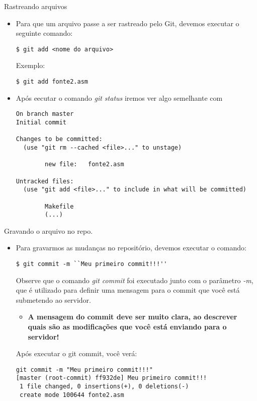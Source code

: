 \begin{slide}[method=direct]{Rastreando arquivos}
	\begin{itemize}
	\item{Para que um arquivo passe a ser rastreado pelo Git, devemos executar o seguinte comando:
		\begin{lstlisting}[style=Bash]
$ git add <nome do arquivo>
		\end{lstlisting}
	       	
	        Exemplo:
	        \begin{lstlisting}[style=Bash]
$ git add fonte2.asm
	        \end{lstlisting}
	        }
	\item{Após eecutar o comando \textit{git status} iremos ver algo semelhante com}
	\begin{lstlisting}[basicstyle=\tiny]
On branch master
Initial commit

Changes to be committed:
  (use "git rm --cached <file>..." to unstage)

        new file:   fonte2.asm

Untracked files:
  (use "git add <file>..." to include in what will be committed)

        Makefile
        (...)
	\end{lstlisting}
	\end{itemize}
\end{slide}

\begin{slide}[method=direct]{Gravando o arquivo no repo.}
	\begin{itemize}
	\item{Para gravarmos as mudanças no repositório, devemos executar o comando:
	        \begin{lstlisting}[style=Bash]
$ git commit -m ``Meu primeiro commit!!!''
	        \end{lstlisting}
	        Observe que o comando \textit{git commit} foi executado junto com o parâmetro \textit{-m}, que é utilizado para definir uma mensagem para o commit que você está submetendo ao servidor.
	        \begin{itemize}
	        \item{\textbf{A mensagem do commit deve ser muito clara, ao descrever quais são as modificações que você está enviando para o servidor!}}
	        \end{itemize}
	        Após executar o git commit, você verá:
	        \begin{lstlisting}[basicstyle=\tiny]
git commit -m "Meu primeiro commit!!!"
[master (root-commit) ff932de] Meu primeiro commit!!!
 1 file changed, 0 insertions(+), 0 deletions(-)
 create mode 100644 fonte2.asm
	         \end{lstlisting}
	        }
	\end{itemize}
\end{slide}

